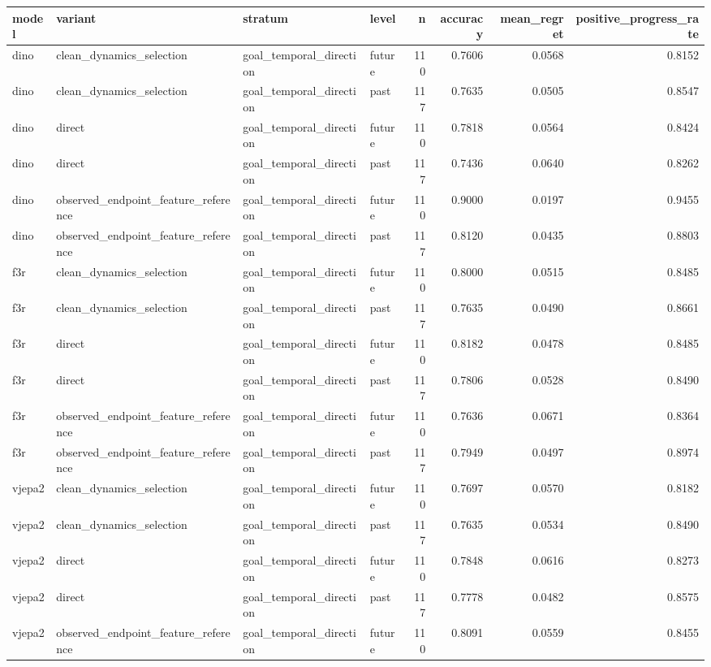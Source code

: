 \begin{tabular}{llllrrrr}
\toprule
model & variant & stratum & level & n & accuracy & mean\_regret & positive\_progress\_rate \\
\midrule
dino & clean\_dynamics\_selection & goal\_temporal\_direction & future & 110 & 0.7606 & 0.0568 & 0.8152 \\
dino & clean\_dynamics\_selection & goal\_temporal\_direction & past & 117 & 0.7635 & 0.0505 & 0.8547 \\
dino & direct & goal\_temporal\_direction & future & 110 & 0.7818 & 0.0564 & 0.8424 \\
dino & direct & goal\_temporal\_direction & past & 117 & 0.7436 & 0.0640 & 0.8262 \\
dino & observed\_endpoint\_feature\_reference & goal\_temporal\_direction & future & 110 & 0.9000 & 0.0197 & 0.9455 \\
dino & observed\_endpoint\_feature\_reference & goal\_temporal\_direction & past & 117 & 0.8120 & 0.0435 & 0.8803 \\
f3r & clean\_dynamics\_selection & goal\_temporal\_direction & future & 110 & 0.8000 & 0.0515 & 0.8485 \\
f3r & clean\_dynamics\_selection & goal\_temporal\_direction & past & 117 & 0.7635 & 0.0490 & 0.8661 \\
f3r & direct & goal\_temporal\_direction & future & 110 & 0.8182 & 0.0478 & 0.8485 \\
f3r & direct & goal\_temporal\_direction & past & 117 & 0.7806 & 0.0528 & 0.8490 \\
f3r & observed\_endpoint\_feature\_reference & goal\_temporal\_direction & future & 110 & 0.7636 & 0.0671 & 0.8364 \\
f3r & observed\_endpoint\_feature\_reference & goal\_temporal\_direction & past & 117 & 0.7949 & 0.0497 & 0.8974 \\
vjepa2 & clean\_dynamics\_selection & goal\_temporal\_direction & future & 110 & 0.7697 & 0.0570 & 0.8182 \\
vjepa2 & clean\_dynamics\_selection & goal\_temporal\_direction & past & 117 & 0.7635 & 0.0534 & 0.8490 \\
vjepa2 & direct & goal\_temporal\_direction & future & 110 & 0.7848 & 0.0616 & 0.8273 \\
vjepa2 & direct & goal\_temporal\_direction & past & 117 & 0.7778 & 0.0482 & 0.8575 \\
vjepa2 & observed\_endpoint\_feature\_reference & goal\_temporal\_direction & future & 110 & 0.8091 & 0.0559 & 0.8455 \\

\end{tabular}
